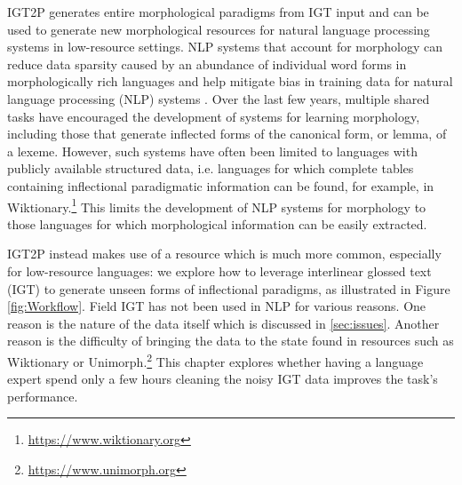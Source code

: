 IGT2P generates entire morphological paradigms from IGT input and can be used to generate new morphological resources for natural language processing systems in low-resource settings. NLP systems that account for morphology can reduce data sparsity caused by an abundance of individual word forms in morphologically rich languages \citep{cotterell-etal-2016-sigmorphon,cotterell-etal-2017-conll,cotterell-etal-2018-conll,mccarthy-etal-2019-sigmorphon,vylomova2020sigmorphon} and help mitigate bias in training data for natural language processing (NLP) systems \citep{zmigrod-etal-2019-counterfactual}. Over the last few years, multiple shared tasks have encouraged the development of systems for learning morphology, including those that generate inflected forms of the canonical form, or lemma, of a lexeme.  However, such systems have often been limited to languages with publicly available structured data, i.e. languages for which complete tables containing inflectional paradigmatic information can be found, for example, in Wiktionary.\footnote{\url{https://www.wiktionary.org}} This limits the development of NLP systems for morphology to those languages for which morphological information can be easily extracted. 

IGT2P instead makes use of a resource which is much more common, especially for low-resource languages:
we explore how to leverage interlinear glossed text (IGT) to generate unseen forms of inflectional paradigms, as illustrated in Figure \ref{fig:Workflow}. Field IGT has not been used in NLP for various reasons. One reason is the nature of the data itself which is discussed in \ref{sec:issues}. Another reason is the difficulty of bringing the data to the state found in resources such as Wiktionary or Unimorph.\footnote{\url{https://www.unimorph.org}} This chapter explores whether having a language expert spend only a few hours cleaning the noisy IGT data improves the task's performance. 


